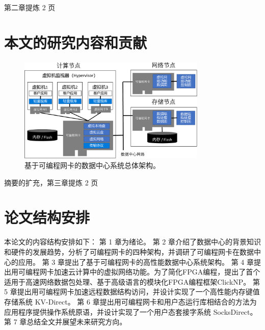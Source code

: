 第二章提炼 2 页

\section{本文的研究内容和贡献}



\begin{figure}[htbp]
	\centering
	\includegraphics[width=0.8\textwidth]{figures/accel_arch.pdf}
	\caption{基于可编程网卡的数据中心系统总体架构。}
	\label{arch:fig:accel-arch}
\end{figure}

摘要的扩充，第三章提炼 2 页

\section{论文结构安排}

本论⽂的内容结构安排如下：
第 1 章为绪论。
第 2 章介绍了数据中心的背景知识和硬件的发展趋势，分析了可编程网卡的四种架构，并调研了可编程网卡在数据中心的应用。
第 3 章提出了基于可编程网卡的高性能数据中心系统架构。
第 4 章提出用可编程网卡加速云计算中的虚拟网络功能。为了简化FPGA编程，提出了首个适用于高速网络数据包处理、基于高级语言的模块化FPGA编程框架ClickNP。
第 5 章提出用可编程网卡加速远程数据结构访问，并设计实现了一个高性能内存键值存储系统 KV-Direct。
第 6 章提出用可编程网卡和用户态运行库相结合的方法为应用程序提供操作系统原语，并设计实现了一个用户态套接字系统 SocksDirect。
第 7 章总结全⽂并展望未来研究方向。